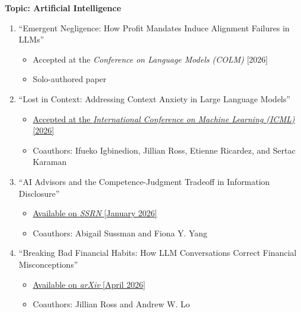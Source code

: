 \documentclass[11pt]{article}
\begin{document}
{\bf Topic: Artificial Intelligence} \\
\vspace*{-.2in}
\begin{enumerate}

\item ``Emergent Negligence: How Profit Mandates Induce Alignment Failures in LLMs''
\begin{itemize}
\vspace*{-.07in}
	\item Accepted at the {\it Conference on Language Models (COLM)} [2026]
\vspace*{-.07in}
	\item Solo-authored paper
\end{itemize}
\vskip 0.24cm

\item ``Lost in Context: Addressing Context Anxiety in Large Language Models''
\begin{itemize}
\vspace*{-.07in}
	\item \href{https://arxiv.org/abs/2607.21616}{Accepted at the {\it International Conference on Machine Learning (ICML)} [2026]}
\vspace*{-.07in}
	\item Coauthors: Ifueko Igbinedion, Jillian Ross, Etienne Ricardez, and Sertac Karaman
\end{itemize}
\vskip 0.24cm

\item ``AI Advisors and the Competence-Judgment Tradeoff in Information Disclosure''
\begin{itemize}
\vspace*{-.07in}
	\item \href{https://papers.ssrn.com/sol3/papers.cfm?abstract_id=6077326}{Available on {\it SSRN} [January 2026]}
\vspace*{-.07in}
	\item Coauthors: Abigail Sussman and Fiona Y. Yang
\end{itemize}
\vskip 0.24cm

\item ``Breaking Bad Financial Habits: How LLM Conversations Correct Financial Misconceptions''
\begin{itemize}
\vspace*{-.07in}
	\item \href{https://arxiv.org/abs/2604.27022}{Available on {\it arXiv} [April 2026]}
\vspace*{-.07in}
	\item Coauthors: Jillian Ross and Andrew W. Lo
\end{itemize}
\vskip 0.24cm


\end{enumerate}
\end{document}

